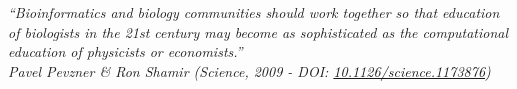\clearpage
\thispagestyle{empty}


\null

\vspace*{0.50\textheight}

\begin{flushleft}
\itshape
“Bioinformatics and biology communities should work together so that education of biologists in the 21st century may become as sophisticated as the computational education of physicists or economists.”\\[1.0em]
\upshape
Pavel Pevzner \& Ron Shamir (Science, 2009 - DOI: \href{https://doi.org/10.1126/science.1173876}{10.1126/science.1173876})
\end{flushleft}

\restoregeometry
\clearpage